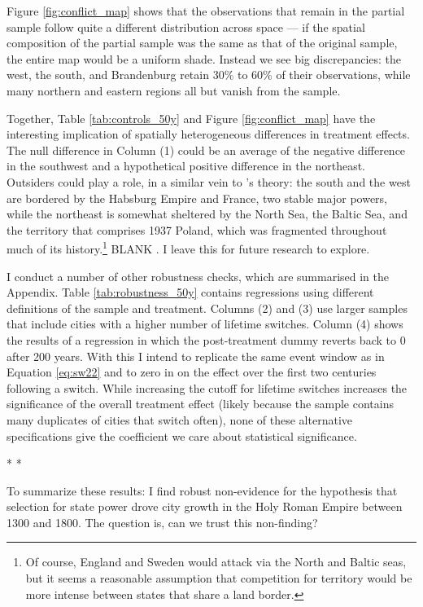 \documentclass[11pt, a4paper]{article}
\newcommand{\decoline}{%
  \par
  \vspace{0.33\baselineskip}
  \hfill
  {\large* * *}
  \hfill
  \vspace{0.33\baselineskip}
\par}
\begin{document}
Figure \ref{fig:conflict_map} shows that the observations that remain in the partial sample follow quite a different distribution across space --- if the spatial composition of the partial sample was the same as that of the original sample, the entire map would be a uniform shade. Instead we see big discrepancies: the west, the south, and Brandenburg retain 30\% to 60\% of their observations, while many northern and eastern regions all but vanish from the sample.

Together, Table \ref{tab:controls_50y} and Figure \ref{fig:conflict_map} have the interesting implication of spatially heterogeneous differences in treatment effects. The null difference in Column (1) could be an average of the negative difference in the southwest and a hypothetical positive difference in the northeast. Outsiders could play a role, in a similar vein to \cite{levine2021, levine2022}'s theory: the south and the west are bordered by the Habsburg Empire and France, two stable major powers, while the northeast is somewhat sheltered by the North Sea, the Baltic Sea, and the territory that comprises 1937 Poland, which was fragmented throughout much of its history.\footnote
{
Of course, England and Sweden would attack via the North and Baltic seas, but it seems a reasonable assumption that competition for territory would be more intense between states that share a land border.
} 
BLANK \cite{cervellati2022}. I leave this for future research to explore.

I conduct a number of other robustness checks, which are summarised in the Appendix. Table \ref{tab:robustness_50y} contains regressions using different definitions of the sample and treatment. Columns (2) and (3) use larger samples that include cities with a higher number of lifetime switches. Column (4) shows the results of a regression in which the post-treatment dummy reverts back to 0 after 200 years. With this I intend to replicate the same event window as in Equation \eqref{eq:sw22} and to zero in on the effect over the first two centuries following a switch. While increasing the cutoff for lifetime switches increases the significance of the overall treatment effect (likely because the sample contains many duplicates of cities that switch often), none of these alternative specifications give the coefficient we care about statistical significance.

\decoline

To summarize these results: I find robust non-evidence for the hypothesis that selection for state power drove city growth in the Holy Roman Empire between 1300 and 1800. The question is, can we trust this non-finding?
\end{document}
